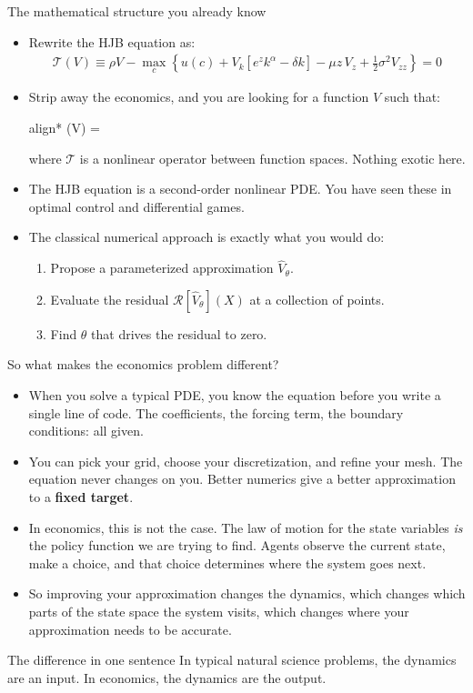 \documentclass[aspectratio=169,10pt]{beamer}
\newcommand{\emphcolor}[1]{\textbf{\textcolor{emphcolorval}{#1}}}
\newcommand{\Resid}{\mathcal{R}}
\newcommand{\Op}{\mathcal{T}}
\begin{document}
\begin{frame}{The mathematical structure you already know}
	\begin{itemize}
		\item Rewrite the HJB equation as:
		\begin{align*}
			\Op(V) \equiv \rho V - \max_c \left\{ u(c) + V_k\!\left[e^z k^\alpha - \delta k\right] - \mu z\, V_z + \tfrac{1}{2}\sigma^2 V_{zz} \right\} = 0
		\end{align*}
		\item Strip away the economics, and you are looking for a function $V$ such that:
		\begin{empheq}[box=\tcbhighmath]{align*}
			\Op(V) = 
		\end{empheq}
		where $\Op$ is a nonlinear operator between function spaces. Nothing exotic here.
		\item The HJB equation is a second-order nonlinear PDE. You have seen these in optimal control and differential games.
		\item The classical numerical approach is exactly what you would do:
		\begin{enumerate}
			\item Propose a parameterized approximation $\widehat{V}_\theta$.
			\item Evaluate the residual $\Resid[\widehat{V}_\theta](X)$ at a collection of points.
			\item Find $\theta$ that drives the residual to zero.
		\end{enumerate}
	\end{itemize}
\end{frame}

\begin{frame}{So what makes the economics problem different?}
	\begin{itemize}
		\item When you solve a typical PDE, you know the equation before you write a single line of code. The coefficients, the forcing term, the boundary conditions: all given.
		\item You can pick your grid, choose your discretization, and refine your mesh. The equation never changes on you. Better numerics give a better approximation to a \emphcolor{fixed target}.
		\item In economics, this is not the case. The law of motion for the state variables \emph{is} the policy function we are trying to find. Agents observe the current state, make a choice, and that choice determines where the system goes next.
		\item So improving your approximation changes the dynamics, which changes which parts of the state space the system visits, which changes where your approximation needs to be accurate.
	\end{itemize}
	\begin{block}{The difference in one sentence}
		In typical natural science problems, the dynamics are an input. In economics, the dynamics are the output.
	\end{block}
\end{frame}
\end{document}
